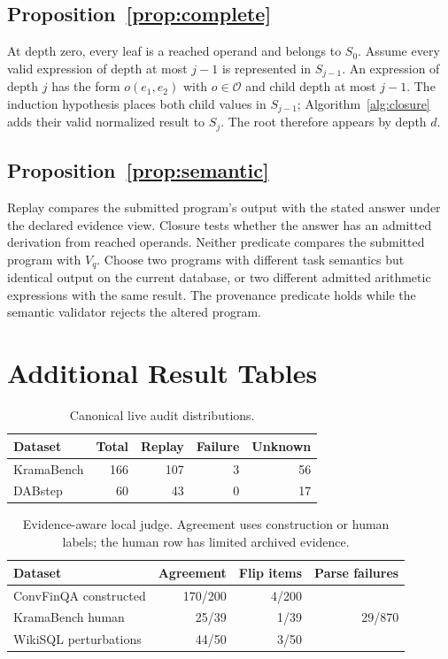 \documentclass[5p,times]{elsarticle}
\newcommand{\opset}{\mathcal{O}}
\begin{document}
\subsection{Proposition~\ref{prop:complete}}
At depth zero, every leaf is a reached operand and belongs to $S_0$. Assume every valid expression of depth at most $j-1$ is represented in $S_{j-1}$. An expression of depth $j$ has the form $o(e_1,e_2)$ with $o\in\opset$ and child depth at most $j-1$. The induction hypothesis places both child values in $S_{j-1}$; Algorithm~\ref{alg:closure} adds their valid normalized result to $S_j$. The root therefore appears by depth $d$.

\subsection{Proposition~\ref{prop:semantic}}
Replay compares the submitted program's output with the stated answer under the declared evidence view. Closure tests whether the answer has an admitted derivation from reached operands. Neither predicate compares the submitted program with $V_q$. Choose two programs with different task semantics but identical output on the current database, or two different admitted arithmetic expressions with the same result. The provenance predicate holds while the semantic validator rejects the altered program.

\section{Additional Result Tables}\label{app:tables}

\begin{table}[ht]
\centering
\caption{Canonical live audit distributions.}
\scriptsize
\begin{tabular}{@{}lrrrr@{}}
\toprule
Dataset & Total & Replay & Failure & Unknown \\
\midrule
KramaBench & 166 & 107 & 3 & 56 \\
DABstep & 60 & 43 & 0 & 17 \\
\bottomrule
\end{tabular}
\end{table}

\begin{table}[ht]
\centering
\caption{Evidence-aware local judge. Agreement uses construction or human labels; the human row has limited archived evidence.}
\scriptsize
\begin{tabular}{@{}lrrr@{}}
\toprule
Dataset & Agreement & Flip items & Parse failures \\
\midrule
ConvFinQA constructed & 170/200 & 4/200 & \multirow{3}{*}{29/870} \\
KramaBench human & 25/39 & 1/39 & \\
WikiSQL perturbations & 44/50 & 3/50 & \\
\bottomrule
\end{tabular}
\end{table}
\end{document}
